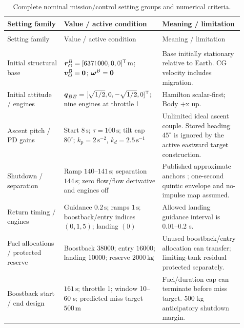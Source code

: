 \begingroup\small\setlength{\tabcolsep}{4pt}\renewcommand{\arraystretch}{1.1}
\begin{longtable}{@{}>{\raggedright\arraybackslash}p{0.23\linewidth}>{\raggedright\arraybackslash}p{0.4\linewidth}>{\raggedright\arraybackslash}p{0.33\linewidth}@{}}
\caption{Complete nominal mission/control setting groups and numerical criteria.}\label{tab:app-mission}\\
\toprule
Setting family & Value / active condition & Meaning / limitation \\
\midrule\endfirsthead
\multicolumn{3}{l}{\small\textit{Table \ref{tab:app-mission} continued}}\\
\toprule
Setting family & Value / active condition & Meaning / limitation \\
\midrule\endhead
\midrule\multicolumn{3}{r}{\small\textit{Continued on next page}}\\\endfoot
\bottomrule\endlastfoot
Initial structural base & $\boldsymbol{r}_O^B=[6371000,0,0]^{\mathsf T}\,\mathrm{m}$; $\boldsymbol{v}_O^B=\boldsymbol{0}$; $\boldsymbol{\omega}^B=\boldsymbol{0}$ & Base initially stationary relative to Earth. CG velocity includes migration. \\
Initial attitude / engines & $\boldsymbol{q}_{BE}=[\sqrt{1/2},0,-\sqrt{1/2},0]^{\mathsf T}$; nine engines at throttle 1 & Hamilton scalar-first; Body +x up. \\
Ascent pitch / PD gains & Start $8\,\mathrm{s}$; $\tau=100\,\mathrm{s}$; tilt cap $80^\circ$; $k_p=2\,\mathrm{s^{-2}}$, $k_d=2.5\,\mathrm{s^{-1}}$ & Unlimited ideal ascent couple. Stored heading $45^\circ$ is ignored by the active eastward target construction. \\
Shutdown / separation & Ramp $140$--$141\,\mathrm{s}$; separation $144\,\mathrm{s}$; zero flow/flow derivative and engines off & Published approximate anchors \cite{nasacrs10press}; one-second quintic envelope and no-impulse map assumed. \\
Return timing / engines & Guidance $0.2\,\mathrm{s}$; ramps $1\,\mathrm{s}$; boostback/entry indices $(0,1,5)$; landing $(0)$ & Allowed landing guidance interval is 0.01--0.2 s. \\
Fuel allocations / protected reserve & Boostback $38000$; entry $16000$; landing $10000$; reserve $2000\,\mathrm{kg}$ & Unused boostback/entry allocation can transfer; limiting-tank residual protected separately. \\
Boostback start / end design & $161\,\mathrm{s}$; throttle 1; window 10--60 s; predicted miss target $500\,\mathrm{m}$ & Fuel/duration cap can terminate before miss target. 500 kg anticipatory shutdown margin. \\

\end{longtable}
